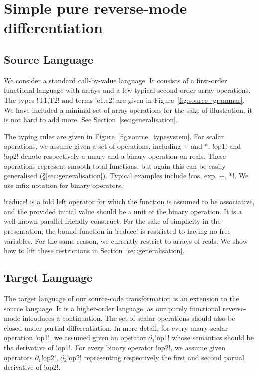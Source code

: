 \section{Simple pure reverse-mode differentiation}
\label{sec:simplediff}

\subsection{Source Language}
\label{sub:sourcelang}

\label{sub:sourcelang}

We consider a standard call-by-value language. 
It consists of a first-order functional language with arrays and a few typical second-order array operations. 
The types !T1,T2! and terms !e1,e2! are given in Figure~\ref{fig:source_grammar}.
We have included a minimal set of array operations for the sake of illustration,  it is not hard to add more.
See Section~\ref{sec:generalisation}.



The typing rules are given in Figure~\ref{fig:source_typesystem}. 
For scalar operations, we assume given a set of operations, including $+$ and $*$. 
!op1! and !op2! denote respectively a unary and a binary operation on reals. 
These operations represent smooth total functions, 
but again this can be easily generalised (\S\ref{sec:generalisation}).  
Typical examples include !cos, exp, +, *!. 
We use infix notation for binary operators.

!reduce! is a fold left operator for which the function is assumed to be associative, 
and the provided initial value should be a unit of the binary operation.
It is a well-known parallel friendly construct. For the sake of simplicity in the presentation, the bound function in !reduce! 
is restricted to having no free variables. For the same reason, we currently restrict to arrays of reals.
We show how to lift these restrictions in Section~\ref{sec:generalisation}.



\subsection{Target Language}

The target language of our source-code transformation is an extension to the source language.
It is a higher-order language, as our purely functional reverse-mode introduces a continuation.
The set of scalar operations should also be closed under partial differentiation. 
In more detail, for every unary scalar operation !op1!, 
we assumed given an operator $\partial_1$!op1! whose semantics should be the derivative of !op1!.
For every binary operator !op2!, we assume given operators $\partial_1$!op2!, $\partial_2$!op2! 
representing respectively the first and second partial derivative of !op2!.

